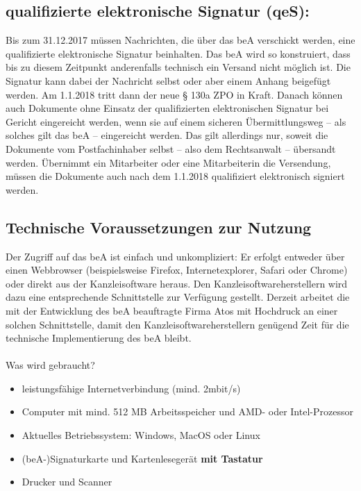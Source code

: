 \subsection{qualifizierte elektronische Signatur (qeS):}
Bis zum 31.12.2017 müssen Nachrichten, die über das beA verschickt werden, eine qualifizierte elektronische Signatur beinhalten. Das beA wird so konstruiert, dass bis zu diesem Zeitpunkt anderenfalls technisch ein Versand nicht möglich ist. Die Signatur kann dabei der Nachricht selbst oder aber einem Anhang beigefügt werden. Am 1.1.2018 tritt dann der neue § 130a ZPO in Kraft. Danach können auch Dokumente ohne Einsatz der qualifizierten elektronischen Signatur bei Gericht eingereicht werden, wenn sie auf einem sicheren Übermittlungsweg – als solches gilt das beA – eingereicht werden. Das gilt allerdings nur, soweit die Dokumente vom Postfachinhaber selbst – also dem Rechtsanwalt – übersandt werden. Übernimmt ein Mitarbeiter oder eine Mitarbeiterin die Versendung, müssen die Dokumente auch nach dem 1.1.2018 qualifiziert elektronisch signiert werden.

\subsection{Technische Voraussetzungen zur Nutzung}
Der Zugriff auf das beA ist einfach und unkompliziert: Er erfolgt entweder über einen Webbrowser (beispielsweise Firefox, Internetexplorer, Safari oder Chrome) oder direkt aus der Kanzleisoftware heraus. Den Kanzleisoftwareherstellern wird dazu eine entsprechende Schnittstelle zur Verfügung gestellt. Derzeit arbeitet die mit der Entwicklung des beA beauftragte Firma Atos mit Hochdruck an einer solchen Schnittstelle, damit den Kanzleisoftwareherstellern genügend Zeit für die technische Implementierung des beA bleibt.\\
\\
Was wird gebraucht?
\begin{itemize}
\item leistungsfähige Internetverbindung (mind. 2mbit/s)
\item Computer mit mind. 512 MB Arbeitsspeicher und AMD- oder Intel-Prozessor
\item Aktuelles Betriebssystem: Windows, MacOS oder Linux
\item (beA-)Signaturkarte und Kartenlesegerät \textbf{mit Tastatur}
\item Drucker und Scanner
\end{itemize}

